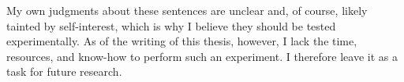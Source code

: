 \documentclass[MilwayThesis]{subfiles}
\begin{document}
My own judgments about these sentences are unclear and, of course, likely tainted by self-interest, which is why I believe they should be tested experimentally.
As of the writing of this thesis, however, I lack the time, resources, and know-how to perform such an experiment.
I therefore leave it as a task for future research.
\end{document}
